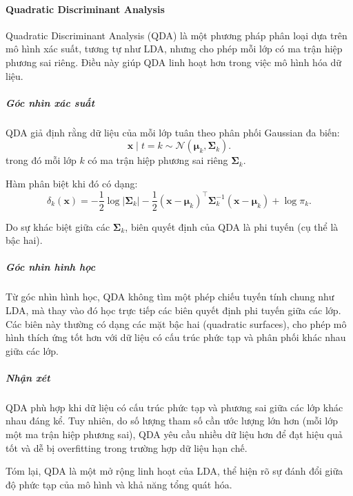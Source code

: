 \paragraph{Quadratic Discriminant Analysis}
Quadratic Discriminant Analysis (QDA) là một phương pháp phân loại dựa trên mô
hình xác suất, tương tự như LDA, nhưng cho phép mỗi lớp có ma trận hiệp phương
sai riêng. Điều này giúp QDA linh hoạt hơn trong việc mô hình hóa dữ liệu.

\subparagraph{Góc nhìn xác suất}
QDA giả định rằng dữ liệu của mỗi lớp tuân theo phân phối Gaussian đa biến:
\begin{equation}
  \boldsymbol{x} \mid t = k \sim \mathcal{N}(\boldsymbol{\mu}_k,
  \boldsymbol{\Sigma}_k).
\end{equation}
trong đó mỗi lớp $k$ có ma trận hiệp phương sai riêng $\boldsymbol{\Sigma}_k$.

Hàm phân biệt khi đó có dạng:
\begin{equation}
  \delta_k(\boldsymbol{x}) = -\frac{1}{2} \log |\boldsymbol{\Sigma}_k|
  - \frac{1}{2} (\boldsymbol{x} - \boldsymbol{\mu}_k)^\intercal
  \boldsymbol{\Sigma}_k^{-1} (\boldsymbol{x} - \boldsymbol{\mu}_k)
  + \log \pi_k.
\end{equation}

Do sự khác biệt giữa các $\boldsymbol{\Sigma}_k$, biên quyết định của QDA là
phi tuyến (cụ thể là bậc hai).

\subparagraph{Góc nhìn hình học}
Từ góc nhìn hình học, QDA không tìm một phép chiếu tuyến tính chung như LDA,
mà thay vào đó học trực tiếp các biên quyết định phi tuyến giữa các lớp. Các
biên này thường có dạng các mặt bậc hai (quadratic surfaces), cho phép mô hình
thích ứng tốt hơn với dữ liệu có cấu trúc phức tạp và phân phối khác nhau giữa
các lớp.

\subparagraph{Nhận xét}
QDA phù hợp khi dữ liệu có cấu trúc phức tạp và phương sai giữa các lớp khác
nhau đáng kể. Tuy nhiên, do số lượng tham số cần ước lượng lớn hơn (mỗi lớp
một ma trận hiệp phương sai), QDA yêu cầu nhiều dữ liệu hơn để đạt hiệu quả
tốt và dễ bị overfitting trong trường hợp dữ liệu hạn chế.

Tóm lại, QDA là một mở rộng linh hoạt của LDA, thể hiện rõ sự đánh đổi giữa độ
phức tạp của mô hình và khả năng tổng quát hóa.
